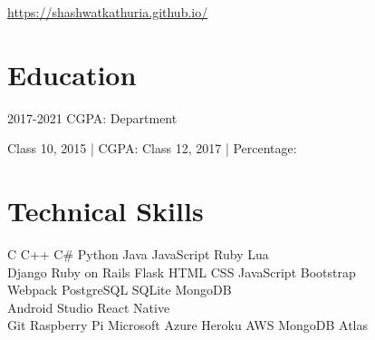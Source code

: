 \documentclass[]{deedy-resume-openfont}
\begin{document}
%
%

%
%


\url{https://shashwatkathuria.github.io/}

%
%

\section{Education}
\begin{large}
    2017-2021
	\textbullet{}
    CGPA: 
    \textbullet{}
    Department 
\end{large}
\sectionsep

\begin{large}
    Class 10, 2015 | CGPA: 
    \textbullet{}
    Class 12, 2017 | Percentage: 
\end{large}
\sectionsep

%
%

\section{Technical Skills}
\begin{large}
 C \textbullet{}   C++ \textbullet{}  C\# \textbullet{} Python \textbullet{} Java \textbullet{}
JavaScript \textbullet{} Ruby \textbullet{} Lua \\

 Django \textbullet{} Ruby on Rails \textbullet{} Flask \textbullet{}
 HTML \textbullet{} CSS \textbullet{} JavaScript \textbullet{} Bootstrap \\ \hspace{36mm} \textbullet{} Webpack \textbullet{} PostgreSQL \textbullet{} SQLite \textbullet{} MongoDB \\

 Android Studio \textbullet{} React Native \\

 Git \textbullet{} Raspberry Pi \textbullet{} Microsoft Azure \textbullet{} Heroku \textbullet{} AWS \textbullet{} MongoDB Atlas \\

\end{large}
\sectionsep
\end{document}
